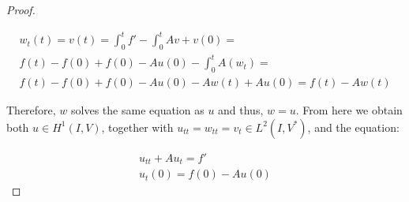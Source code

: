 \documentclass[english,a4paper,9pt,oneside]{scrbook}	%
\theoremstyle{break}
\newenvironment{mproof}[1][\proofname]{%
  \begin{proof}[#1]$ $\par\nobreak\ignorespaces
}{%
  \end{proof}
}
\renewcommand*{\proofname}{Proof}
\theoremstyle{remark}
\begin{document}
\begin{appendices}
\begin{mproof}
\begin{align*}
	w_t(t) = v(t) = \int_0^t f' -\int_0^t Av + v(0) = \\
	f(t) - f(0) + f(0) - Au(0) - \int_0^t A(w_t) = \\
	f(t) - f(0) + f(0) - Au(0) - Aw (t) + Au(0) = f(t) - Aw(t)
\end{align*}

Therefore, $w$ solves the same equation as $u$ and thus, $w=u$. From here we obtain both $u \in H^1(I,V)$, together with $u_{tt} = w_{tt} = v_t \in L^2(I,V^*)$, and the equation:

\begin{align*}
	u_{tt} + Au_t = f'\\
	u_t(0) = f(0) - Au (0)
\end{align*}

\end{mproof}



\end{appendices}
\end{document}
